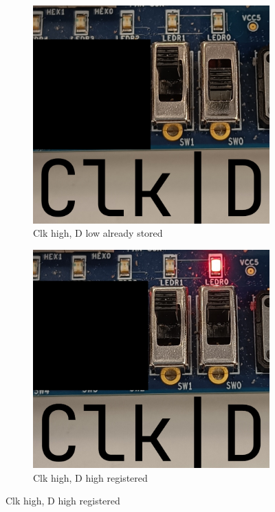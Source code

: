 \documentclass{article}
\begin{document}
\begin{figure}[h]
    \begin{subfigure}[t]{0.45\textwidth}
        \centering
        \includegraphics[width=1\textwidth]{Figures/Part2b_3.jpg}
        \caption{Clk high, D low already stored}
        \label{fig:p2b_3}
    \end{subfigure}
    \hfill
    \begin{subfigure}[t]{0.45\textwidth}
        \centering
        \includegraphics[width=1\textwidth]{Figures/Part2b_4.jpg}
        \caption{Clk high, D high registered}
        \label{fig:p2b_4}
    \end{subfigure}
    

\end{figure}
\end{document}
